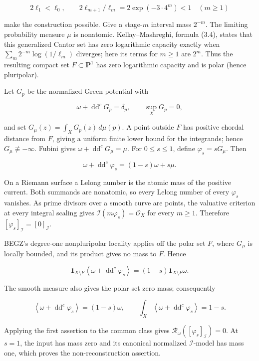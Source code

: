 $$
2\ell_1<\ell_0,\qquad
2\ell_{m+1}/\ell_m=2\exp(-3\cdot4^m)<1\quad(m\ge1)
$$

make the construction possible. Give a stage-$m$ interval mass $2^{-m}$.
The limiting probability measure $\mu$ is nonatomic. Kellay--Mashreghi,
formula (3.4), states that this generalized Cantor set has zero logarithmic
capacity exactly when $\sum_m2^{-m}\log(1/\ell_m)$ diverges; here its terms
for $m\ge1$ are $2^m$. Thus the resulting compact set $F\subset\mathbf P^1$
has zero logarithmic capacity and is polar (hence pluripolar).

Let $G_p$ be the normalized Green potential with

$$
\omega+\operatorname{dd}^cG_p=\delta_p,\qquad\sup_XG_p=0,
$$

and set $G_\mu(z)=\int_XG_p(z)\,d\mu(p)$. A point outside $F$ has positive
chordal distance from $F$, giving a uniform finite lower bound for the
integrands; hence $G_\mu\not\equiv-\infty$. Fubini gives
$\omega+\operatorname{dd}^cG_\mu=\mu$. For $0\le s\le1$, define
$\varphi_s=sG_\mu$. Then

$$
\omega+\operatorname{dd}^c\varphi_s=(1-s)\omega+s\mu.
$$

On a Riemann surface a Lelong number is the atomic mass of the positive
current. Both summands are nonatomic, so every Lelong number of every
$\varphi_s$ vanishes. As prime divisors over a smooth curve are points, the
valuative criterion at every integral scaling gives
$\mathcal I(m\varphi_s)=\mathcal O_X$ for every $m\ge1$. Therefore
$[\varphi_s]_{\mathcal I}=[0]_{\mathcal I}$.

BEGZ's degree-one nonpluripolar locality applies off the polar set $F$, where
$G_\mu$ is locally bounded, and its product gives no mass to $F$. Hence

$$
\mathbf1_{X\setminus F}\left\langle
  \omega+\operatorname{dd}^c\varphi_s\right\rangle
=(1-s)\mathbf1_{X\setminus F}\omega.
$$

The smooth measure also gives the polar set zero mass; consequently

$$
\left\langle\omega+\operatorname{dd}^c\varphi_s\right\rangle=(1-s)\omega,
\qquad
\int_X\left\langle\omega+\operatorname{dd}^c\varphi_s\right\rangle=1-s.
$$

Applying the first assertion to the common class gives
$\mathcal R_\omega([\varphi_s]_{\mathcal I})=0$. At $s=1$, the input has
mass zero and its canonical normalized $\mathcal I$-model has mass one,
which proves the non-reconstruction assertion.


